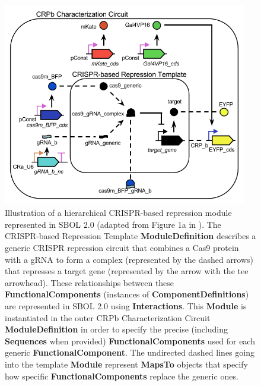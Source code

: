 \begin{figure}[tbph]
\begin{center}
  \includegraphics[width=0.95\textwidth]{figures/crispr_repression2} 
\end{center}
\caption{\label{SBOL2} Illustration of a hierarchical CRISPR-based repression module represented in SBOL 2.0 (adapted from Figure 1a in \cite{kiani2014crispr}). The CRISPR-based Repression Template \textbf{ModuleDefinition} describes a generic CRISPR repression circuit that combines a Cas9 protein with a gRNA to form a complex (represented by the dashed arrows) that represses a target gene (represented by the arrow with the tee arrowhead).  These relationships between these \textbf{FunctionalComponents} (instances of \textbf{ComponentDefinitions}) are represented in SBOL 2.0 using \textbf{Interactions}.  This \textbf{Module} is instantiated in the outer CRPb Characterization Circuit \textbf{ModuleDefinition} in order to specify the precise (including \textbf{Sequences} when provided) \textbf{FunctionalComponents}  used for each generic \textbf{FunctionalComponent}. The undirected dashed lines going into the template \textbf{Module} represent \textbf{MapsTo} objects that specify how specific \textbf{FunctionalComponents} replace the generic ones.}
\end{figure}

